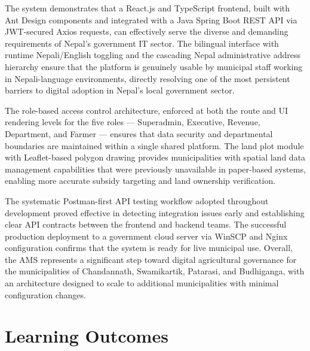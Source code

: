 \documentclass[12pt,a4paper]{report}
\begin{document}
The system demonstrates that a React.js and TypeScript frontend, built with Ant Design
components and integrated with a Java Spring Boot REST API via JWT-secured Axios
requests, can effectively serve the diverse and demanding requirements of Nepal's
government IT sector. The bilingual interface with runtime Nepali/English toggling and
the cascading Nepal administrative address hierarchy ensure that the platform is genuinely
usable by municipal staff working in Nepali-language environments, directly resolving
one of the most persistent barriers to digital adoption in Nepal's local government sector.

The role-based access control architecture, enforced at both the route and UI rendering
levels for the five roles — Superadmin, Executive, Revenue, Department, and Farmer —
ensures that data security and departmental boundaries are maintained within a single
shared platform. The land plot module with Leaflet-based polygon drawing provides
municipalities with spatial land data management capabilities that were previously
unavailable in paper-based systems, enabling more accurate subsidy targeting and
land ownership verification.

The systematic Postman-first API testing workflow adopted throughout development
proved effective in detecting integration issues early and establishing clear API
contracts between the frontend and backend teams. The successful production deployment
to a government cloud server via WinSCP and Nginx configuration confirms that the
system is ready for live municipal use. Overall, the AMS represents a significant step
toward digital agricultural governance for the municipalities of Chandannath,
Swamikartik, Patarasi, and Budhiganga, with an architecture designed to scale to
additional municipalities with minimal configuration changes.

\section{Learning Outcomes}
\end{document}

